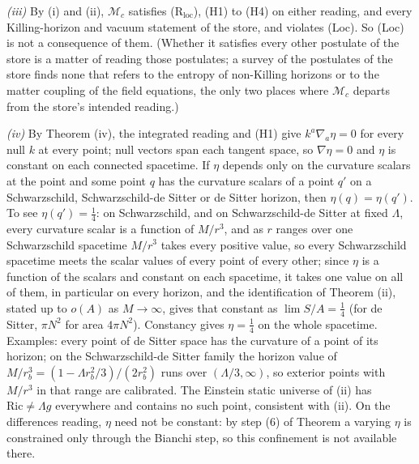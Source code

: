 \emph{(iii)} By (i) and (ii), $\mathcal{M}_{c}$ satisfies (R$_{\mathrm{loc}}$), (H1) to (H4) on either reading, and every Killing-horizon and vacuum statement of the store, and violates (Loc). So (Loc) is not a consequence of them. (Whether it satisfies every other postulate of the store is a matter of reading those postulates; a survey of the postulates of the store finds none that refers to the entropy of non-Killing horizons or to the matter coupling of the field equations, the only two places where $\mathcal{M}_{c}$ departs from the store's intended reading.)

\emph{(iv)} By Theorem (iv), the integrated reading and (H1) give $k^{a}\nabla_{a}\eta = 0$ for every null $k$ at every point; null vectors span each tangent space, so $\nabla\eta = 0$ and $\eta$ is constant on each connected spacetime. If $\eta$ depends only on the curvature scalars at the point and some point $q$ has the curvature scalars of a point $q'$ on a Schwarzschild, Schwarzschild-de Sitter or de Sitter horizon, then $\eta(q) = \eta(q')$. To see $\eta(q') = \tfrac14$: on Schwarzschild, and on Schwarzschild-de Sitter at fixed $\Lambda$, every curvature scalar is a function of $M/r^{3}$, and as $r$ ranges over one Schwarzschild spacetime $M/r^{3}$ takes every positive value, so every Schwarzschild spacetime meets the scalar values of every point of every other; since $\eta$ is a function of the scalars and constant on each spacetime, it takes one value on all of them, in particular on every horizon, and the identification of Theorem (ii), stated up to $o(A)$ as $M \to \infty$, gives that constant as $\lim S/A = \tfrac14$ (for de Sitter, $\pi N^{2}$ for area $4\pi N^{2}$). Constancy gives $\eta = \tfrac14$ on the whole spacetime. Examples: every point of de Sitter space has the curvature of a point of its horizon; on the Schwarzschild-de Sitter family the horizon value of $M/r_{b}^{3} = (1 - \Lambda r_{b}^{2}/3)/(2r_{b}^{2})$ runs over $(\Lambda/3, \infty)$, so exterior points with $M/r^{3}$ in that range are calibrated. The Einstein static universe of (ii) has $\mathrm{Ric} \neq \Lambda g$ everywhere and contains no such point, consistent with (ii). On the differences reading, $\eta$ need not be constant: by step (6) of Theorem  a varying $\eta$ is constrained only through the Bianchi step, so this confinement is not available there.
